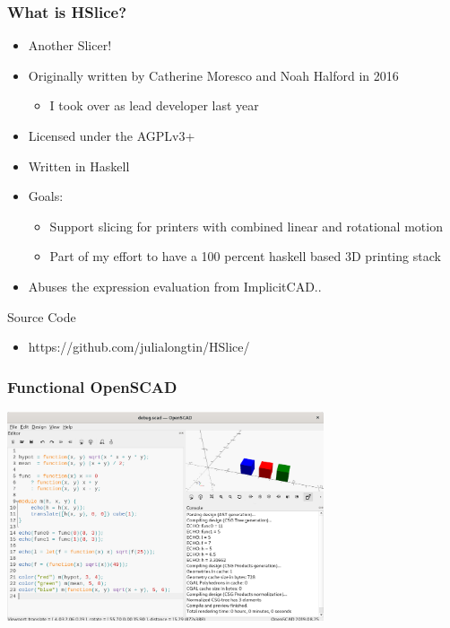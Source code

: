 \documentclass{beamer}
\begin{document}
\begin{frame}
  \frametitle{What is HSlice?}
\begin{itemize}
\item Another Slicer!
\item Originally written by Catherine Moresco and Noah Halford in 2016
  \begin{itemize}
  \item I took over as lead developer last year
  \end{itemize}
\item Licensed under the AGPLv3+
\item Written in Haskell
\item Goals:
  \begin{itemize}
  \item Support slicing for printers with combined linear and rotational motion
  \item Part of my effort to have a 100 percent haskell based 3D printing stack 
  \end{itemize}
\item Abuses the expression evaluation from ImplicitCAD..
\end{itemize}
\begin{block}{Source Code}
\begin{itemize}
\item https://github.com/julialongtin/HSlice/
\end{itemize}
\end{block}
\end{frame}

\begin{frame}
\frametitle{Functional OpenSCAD}
\includegraphics[width=0.7\textwidth, center]{openscad-functional.png}
\end{frame}
\end{document}
